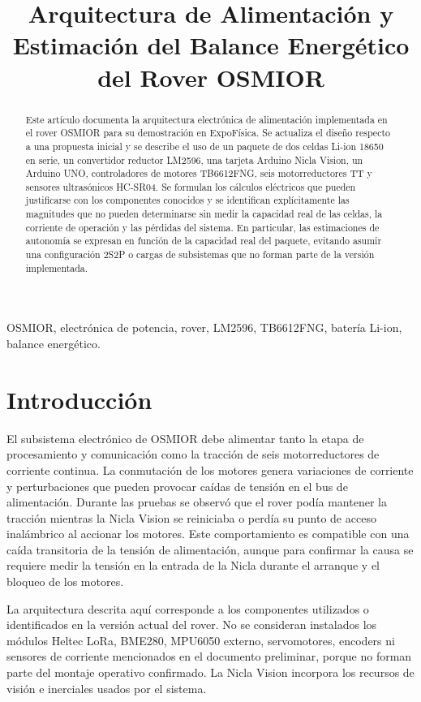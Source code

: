 \documentclass[conference]{IEEEtran}
\title{Arquitectura de Alimentación y Estimación del Balance Energético del Rover OSMIOR}
\author{
\IEEEauthorblockN{Nombre del autor}
\IEEEauthorblockA{
Ingeniería Electrónica\\
Universidad del Norte\\
Barranquilla, Colombia\\
correo@ejemplo.com}
}
\begin{document}
\maketitle

\begin{abstract}
Este artículo documenta la arquitectura electrónica de alimentación implementada en el rover OSMIOR para su demostración en ExpoFísica. Se actualiza el diseño respecto a una propuesta inicial y se describe el uso de un paquete de dos celdas Li-ion 18650 en serie, un convertidor reductor LM2596, una tarjeta Arduino Nicla Vision, un Arduino UNO, controladores de motores TB6612FNG, seis motorreductores TT y sensores ultrasónicos HC-SR04. Se formulan los cálculos eléctricos que pueden justificarse con los componentes conocidos y se identifican explícitamente las magnitudes que no pueden determinarse sin medir la capacidad real de las celdas, la corriente de operación y las pérdidas del sistema. En particular, las estimaciones de autonomía se expresan en función de la capacidad real del paquete, evitando asumir una configuración 2S2P o cargas de subsistemas que no forman parte de la versión implementada.
\end{abstract}

\begin{IEEEkeywords}
OSMIOR, electrónica de potencia, rover, LM2596, TB6612FNG, batería Li-ion, balance energético.
\end{IEEEkeywords}

\section{Introducción}
El subsistema electrónico de OSMIOR debe alimentar tanto la etapa de procesamiento y comunicación como la tracción de seis motorreductores de corriente continua. La conmutación de los motores genera variaciones de corriente y perturbaciones que pueden provocar caídas de tensión en el bus de alimentación. Durante las pruebas se observó que el rover podía mantener la tracción mientras la Nicla Vision se reiniciaba o perdía su punto de acceso inalámbrico al accionar los motores. Este comportamiento es compatible con una caída transitoria de la tensión de alimentación, aunque para confirmar la causa se requiere medir la tensión en la entrada de la Nicla durante el arranque y el bloqueo de los motores.

La arquitectura descrita aquí corresponde a los componentes utilizados o identificados en la versión actual del rover. No se consideran instalados los módulos Heltec LoRa, BME280, MPU6050 externo, servomotores, encoders ni sensores de corriente mencionados en el documento preliminar, porque no forman parte del montaje operativo confirmado. La Nicla Vision incorpora los recursos de visión e inerciales usados por el sistema.
\end{document}
